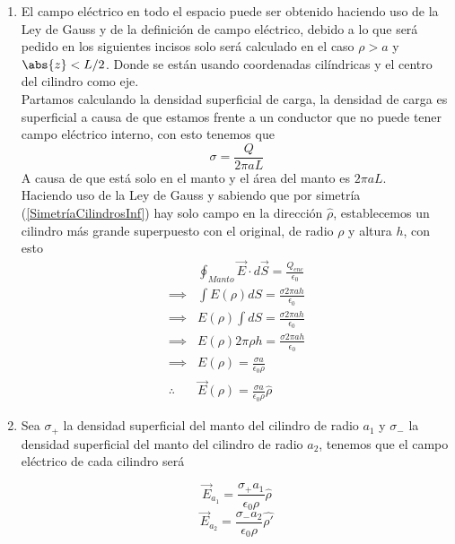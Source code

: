 \begin{enumerate}[label=\alph*)]
    \item El campo eléctrico en todo el espacio puede ser obtenido haciendo uso de la Ley de Gauss y de la definición de campo eléctrico, debido a lo que será pedido en los siguientes incisos solo será calculado en el caso $\rho > a$ y $\abs{z} < L/2$. Donde se están usando coordenadas cilíndricas y el centro del cilindro como eje.\\
    
    Partamos calculando la densidad superficial de carga, la densidad de carga es superficial a causa de que estamos frente a un conductor que no puede tener campo eléctrico interno, con esto tenemos que 
    \[\sigma = \frac{Q}{2\pi aL}\]
    A causa de que está solo en el manto y el área del manto es $2\pi aL$.\\
    
    Haciendo uso de la Ley de Gauss y sabiendo que por simetría (\ref{SimetríaCilindrosInf}) hay solo campo en la dirección $\hat{\rho}$, establecemos un cilindro más grande superpuesto con el original, de radio $\rho$ y altura $h$, con esto
    \begin{equation}
        \begin{split}
            &\oint_{Manto} \Vec{E}\cdot d\Vec{S} = \frac{Q_{enc}}{\epsilon_0}\\
            \implies &\int E(\rho)dS = \frac{\sigma 2\pi a h}{\epsilon_0}\\
            \implies &E(\rho) \int dS = \frac{\sigma 2\pi a h}{\epsilon_0}\\
            \implies &E(\rho) 2 \pi \rho h = \frac{\sigma 2\pi a h}{\epsilon_0}\\
            \implies &E(\rho) = \frac{\sigma a}{\epsilon_0 \rho}\\
            \therefore \quad &\Vec{E}(\rho) = \frac{\sigma a}{\epsilon_0 \rho}\hat{\rho}
        \end{split}
        \nonumber 
    \end{equation}
    
    \item Sea $\sigma_+$ la densidad superficial del manto del cilindro de radio $a_1$ y $\sigma_-$ la densidad superficial del manto del cilindro de radio $a_2$, tenemos que el campo eléctrico de cada cilindro será
    
    \[\Vec{E}_{a_1} = \frac{\sigma_+ a_1}{\epsilon_0 \rho}\hat{\rho}\]
    \[\Vec{E}_{a_2} = \frac{\sigma_- a_2}{\epsilon_0 \rho}\hat{\rho'}\]
    

\end{enumerate}
